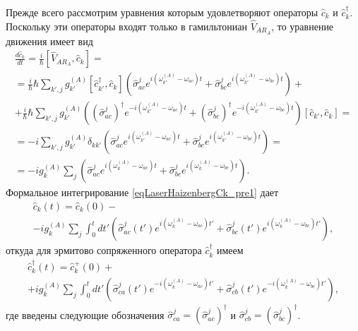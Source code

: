 Прежде всего рассмотрим уравнения которым удовлетворяют операторы
$\hat{c}_k$ и $\hat{c}_k^{\dag}$. Поскольку эти операторы входят только в
гамильтониан $\hat{V}_{AR_A}$, то уравнение движения имеет вид
\begin{eqnarray}
\frac{d \hat{c}_k}{d t} = \frac{i}{\hbar}\left[\hat{V}_{AR_A}, \hat{c}_k
\right] = 
\nonumber \\
= \frac{i}{\hbar} \hbar 
\sum_{k',j} 
g_{k'}^{(A)}\left[\hat{c}_{k'}^{\dag}, \hat{c}_k\right]
\left(
\hat{\sigma}_{ac}^{j} e^{i\left(\omega_{k'}^{(A)} - \omega_{ac}\right)t}
+
\hat{\sigma}_{bc}^{j} e^{i\left(\omega_{k'}^{(A)} - \omega_{bc}\right)t}
\right) +
\nonumber \\
+
\frac{i}{\hbar} \hbar 
\sum_{k',j} 
g_{k'}^{(A)}
\left(
\left(\hat{\sigma}_{ac}^{j}\right)^{\dag} e^{- i\left(\omega_{k'}^{(A)} - \omega_{ac}\right)t}
+
\left(\hat{\sigma}_{bc}^{j}\right)^{\dag} e^{- i\left(\omega_{k'}^{(A)} - \omega_{bc}\right)t}
\right)
\left[\hat{c}_{k'}, \hat{c}_k\right] =
\nonumber \\
= 
 - i 
\sum_{k',j} 
g_{k'}^{(A)}\delta_{kk'}
\left(
\hat{\sigma}_{ac}^{j} e^{i\left(\omega_{k'}^{(A)} - \omega_{ac}\right)t}
+
\hat{\sigma}_{bc}^{j} e^{i\left(\omega_{k'}^{(A)} - \omega_{bc}\right)t}
\right) = 
\nonumber \\
=
 - i g_{k}^{(A)}
\sum_{j} 
\left(
\hat{\sigma}_{ac}^{j} e^{i\left(\omega_{k}^{(A)} - \omega_{ac}\right)t}
+
\hat{\sigma}_{bc}^{j} e^{i\left(\omega_{k}^{(A)} - \omega_{bc}\right)t}
\right).
\label{eqLaserHaizenbergCk_pre1}
\end{eqnarray} 
Формальное интегрирование \eqref{eqLaserHaizenbergCk_pre1} дает
\begin{eqnarray}
\hat{c}_k\left(t\right) = \hat{c}_k\left(0\right) -
\nonumber \\
 - i g_{k}^{(A)}
\sum_{j} 
\int_0^t d t'
\left(
\hat{\sigma}_{ac}^{j}\left(t'\right) e^{i\left(\omega_{k}^{(A)} - \omega_{ac}\right)t'}
+
\hat{\sigma}_{bc}^{j}\left(t'\right) e^{i\left(\omega_{k}^{(A)} - \omega_{bc}\right)t'}
\right),
\label{eqLaserHaizenbergCk}
\end{eqnarray}
откуда для эрмитово сопряженного оператора $\hat{c}_k^{\dag}$ имеем
\begin{eqnarray}
\hat{c}_k^{\dag}\left(t\right) = \hat{c}_k^{+}\left(0\right) +
\nonumber \\
 + i g_{k}^{(A)}
\sum_{j} 
\int_0^t d t'
\left(
\hat{\sigma}_{ca}^{j}\left(t'\right) e^{-i\left(\omega_{k}^{(A)} - \omega_{ac}\right)t'}
+
\hat{\sigma}_{cb}^{j}\left(t'\right) e^{-i\left(\omega_{k}^{(A)} - \omega_{bc}\right)t'}
\right),
\label{eqLaserHaizenbergCkPlus}
\end{eqnarray}
где введены следующие обозначения $\hat{\sigma}_{ca}^{j} =
\left(\hat{\sigma}_{ac}^{j}\right)^{\dag}$ и
$\hat{\sigma}_{cb}^{j} = \left(\hat{\sigma}_{bc}^{j}\right)^{\dag}$.

